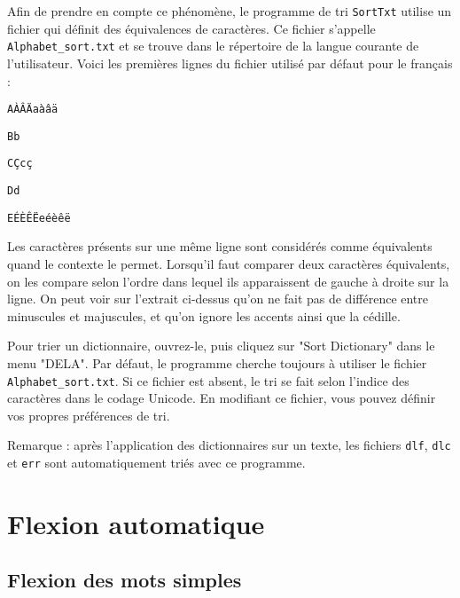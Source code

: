 \bigskip {}
\noindent
Afin de prendre en compte ce phénomène, le programme de tri \verb+SortTxt+  
 utilise un fichier qui définit des
équivalences de caractères.   Ce fichier s’appelle
\verb+Alphabet_sort.txt+  et se trouve dans le répertoire
de la langue courante de l’utilisateur. Voici les premières lignes du fichier utilisé par défaut
pour le français :


\bigskip
\begin{minipage}{\textwidth}
\noindent\texttt{AÀÂÄaàâä}

\noindent\texttt{Bb}

\noindent\texttt{CÇcç}

\noindent\texttt{Dd}

\noindent\texttt{EÉÈÊËeéèêë}
\end{minipage}

\bigskip
\noindent Les caractères présents sur une même ligne sont considérés comme équivalents quand
le contexte le permet. Lorsqu’il faut comparer deux caractères équivalents, on les compare
selon l’ordre dans lequel ils apparaissent de gauche à droite sur la ligne. On peut voir sur
l’extrait ci-dessus qu’on ne fait pas de différence entre minuscules et majuscules, et qu’on
ignore les accents ainsi que la cédille.


\bigskip
\noindent Pour trier un dictionnaire, ouvrez-le, puis cliquez sur "Sort Dictionary" dans le menu
"DELA". Par défaut, le programme cherche toujours à utiliser le fichier \verb+Alphabet_sort.txt+.
Si ce fichier est absent, le tri se fait selon l’indice des caractères dans le codage Unicode.
En modifiant ce fichier, vous pouvez définir vos propres préférences de tri.


\bigskip
\noindent Remarque : après l’application des dictionnaires sur un texte, les fichiers
\verb+dlf+, \verb+dlc+ et \verb+err+ sont automatiquement triés avec ce programme.
 



\section{Flexion automatique}
\label{section-automatic-inflection}
\subsection{Flexion des mots simples}

